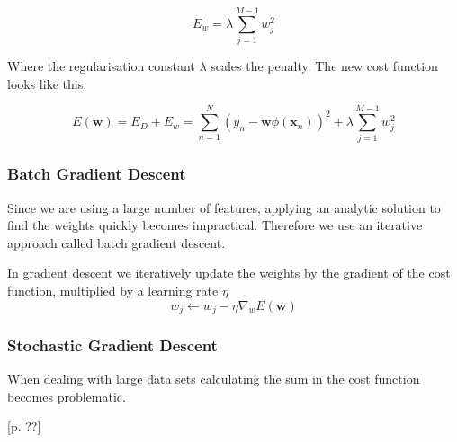 \[ E_w = \lambda \sum_{j=1}^{M-1} w_j^2 \]

Where the regularisation constant $\lambda$ scales the penalty. 
The new cost function looks like this.

\[ E(\textbf{w})
  = E_D + E_w 
  = \sum_{n=1}^{N} \left(y_n - \textbf{w} \phi(\textbf{x}_n) \right)^2 + \lambda \sum_{j=1}^{M-1} w_j^2 \]

\begin{flushright}
\cite[online course]{courseraAI}
\end{flushright}

\subsubsection{Batch Gradient Descent}

Since we are using a large number of features, applying an analytic solution to find the weights quickly becomes impractical.
Therefore we use an iterative approach called batch gradient descent.

In gradient descent we iteratively update the weights by the gradient of the cost function, multiplied by a learning rate $\eta$  
\[ w_j \leftarrow w_j - \eta \nabla_w E(\textbf{w}) \]

\subsubsection{Stochastic Gradient Descent}\label{sec:stochastic}

When dealing with large data sets calculating the sum in the cost function becomes problematic.
 



\begin{flushright}
\cite{Bishop2006}[p. ??]
\end{flushright}

